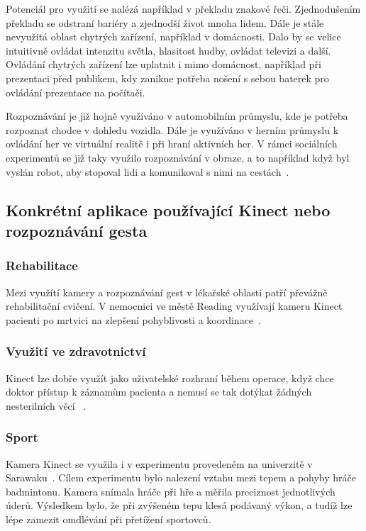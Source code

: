 Potenciál pro využití se nalézá například v překladu znakové řeči. Zjednodušením překladu se odstraní bariéry a zjednodší život mnoha lidem. Dále je stále nevyužitá oblast chytrých zařízení, například v domácnosti. Dalo by se velice intuitivně ovládat intenzitu světla, hlasitost hudby, ovládat televizi a další. Ovládání chytrých zařízení lze uplatnit i mimo domácnost, například při prezentaci před publikem, kdy zanikne potřeba nošení s sebou baterek pro ovládání prezentace na počítači.

Rozpoznávání je již hojně využíváno v automobilním průmyslu, kde je potřeba rozpoznat chodce v dohledu vozidla. Dále je využíváno v herním průmyslu k ovládání her ve virtuální realitě i při hraní aktivních her. V rámci sociálních experimentů se již taky využilo rozpoznávání v obraze, a to například když byl vyslán robot, aby stopoval lidi a komunikoval s nimi na cestách~\cite{hitch}.

\subsection{Konkrétní aplikace používající Kinect nebo rozpoznávání gesta}
\subsubsection{Rehabilitace}
Mezi využítí kamery a rozpoznávání gest v lékařské oblasti patří převážně rehabilitační cvičení. V nemocnici ve městě Reading využívají kameru Kinect pacienti po mrtvici na zlepšení pohyblivosti a koordinace~\cite{21}. 

\subsubsection{Využití ve zdravotnictví}
Kinect lze dobře využít jako uživatelské rozhraní během operace, když chce doktor přístup k záznamům pacienta a nemusí se tak dotýkat žádných nesterilních věcí ~\cite{24}.\\

\subsubsection{Sport}
Kamera Kinect se využila i v experimentu provedeném na univerzitě v Sarawaku~\cite{22}. Cílem experimentu bylo nalezení vztahu mezi tepem a pohyby hráče badmintonu. Kamera snímala hráče při hře a měřila preciznost jednotlivých úderů. Výsledkem bylo, že při zvýšeném tepu klesá podávaný výkon, a tudíž lze lépe zamezit omdlévání při přetížení sportovců.


